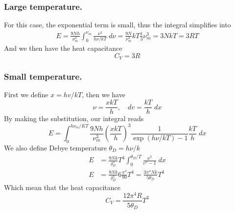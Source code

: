 \documentclass[../../../Main.tex]{subfiles}
\begin{document}
\subsubsection{Large temperature.} For this case, the exponential term is small, thus the integral simplifies into
\begin{align*}
    E=\frac{9Nh}{\nu_m^3}\int_{0}^{\nu_m}\frac{\nu^3}{h\nu/kT}\;d\nu= \frac{9N}{\nu_m^3}kT\frac{1}{3}\nu_m^3=3NkT=3RT
\end{align*}
And we then have the heat capacitance 
\begin{equation*}
    C_V=3R
\end{equation*}

\subsubsection{Small temperature.} First we define $x=hv/kT$, then we have 
\begin{equation*}
    \nu=\frac{xkT}{h},\quad dv=\frac{kT}{h}\;dx
\end{equation*}
By making the substitution, our integral reads 
\begin{equation*}
    E=\int_{0}^{h\nu_m/KT}\frac{9Nh}{\nu_m^3}\left(\frac{xkT}{h}\right)^3\frac{1}{\exp(h\nu/kT)-1}\frac{kT}{h}\;dx
\end{equation*}
We also define Debye temperature $\theta_D=h\nu/k$
\begin{align*}
    E&=\frac{9Nk}{\delta_D^3}T^4\int_{0}^{\theta_D/T}\frac{x^3}{e^x-1}\;dx\\
    E&=\frac{9Nk}{\delta_D^3}6\frac{\pi^4}{90}T^4=\frac{3\pi^4Nk}{5\theta_D}T^4
\end{align*}
Which mean that the heat capacitance
\begin{equation*}
    C_V=\frac{12\pi^4R}{5\theta_D}T^3
\end{equation*}
\end{document}

